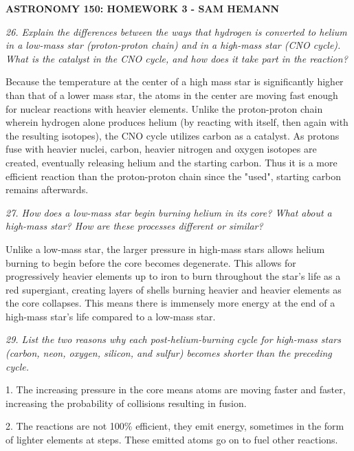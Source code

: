 \documentclass[letterpaper,11pt]{article}
\begin{document}
	
\begin{center}
	\bf
	ASTRONOMY 150: HOMEWORK 3 - SAM HEMANN
\end{center}
	
	
	

\it
26. Explain the differences between the ways that hydrogen is
converted to helium in a low-mass star (proton-proton chain)
and in a high-mass star (CNO cycle). What is the catalyst in
the CNO cycle, and how does it take part in the reaction?
\normalfont
\smallskip
\par
Because the temperature at the center of a high mass star is significantly higher than
that of a lower mass star, the atoms in the center are moving fast 
enough for nuclear reactions with heavier elements. Unlike the proton-proton chain 
wherein hydrogen alone produces helium (by reacting with itself, then again with the
resulting isotopes), the CNO cycle utilizes carbon as a catalyst. As protons fuse
with heavier nuclei, carbon, heavier nitrogen and oxygen isotopes are created, 
eventually releasing helium and the starting carbon. Thus it is a more efficient 
reaction than the proton-proton chain since the "used", starting carbon remains afterwards. 


\bigskip
\it
27. How does a low-mass star begin burning helium in its core?
What about a high-mass star? How are these processes
different or similar?
\normalfont
\smallskip
\par
Unlike a low-mass star, the larger pressure in high-mass stars allows helium burning to begin before the core becomes degenerate. This allows for progressively heavier elements up to iron to burn throughout the star's life as a red supergiant, creating layers of shells burning heavier and heavier elements as the core collapses. This means there is immensely more energy at the end of a high-mass star's life compared to a low-mass star. 

\bigskip
\it
29. List the two reasons why each post-helium-burning cycle for
high-mass stars (carbon, neon, oxygen, silicon, and sulfur)
becomes shorter than the preceding cycle.
\normalfont
\smallskip
\par
1. The increasing pressure in the core means atoms are moving faster and faster, increasing the probability of collisions resulting in fusion.
\par
2. The reactions are not 100\% efficient, they emit energy, sometimes in the form of lighter elements at steps. These emitted atoms go on to fuel other reactions.
\end{document}
